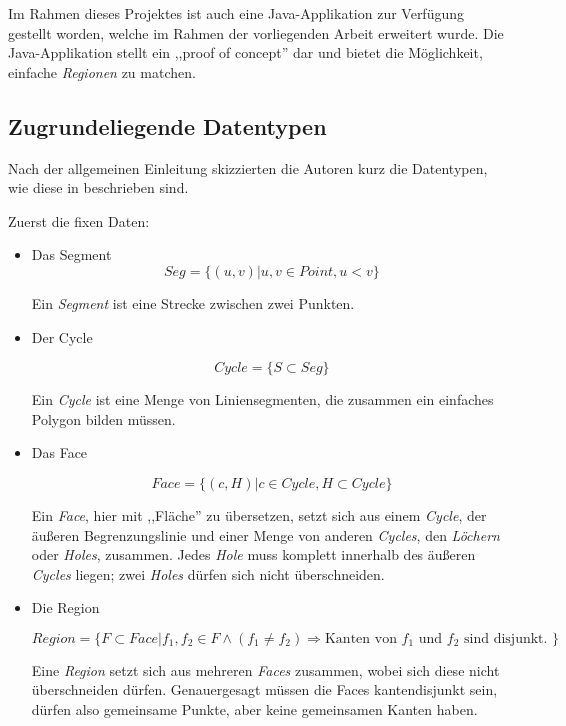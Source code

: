 Im Rahmen dieses Projektes ist auch eine Java-Applikation zur Verfügung gestellt worden, welche im Rahmen der vorliegenden Arbeit erweitert wurde. Die Java-Applikation stellt ein ,,proof of concept'' dar und bietet die Möglichkeit, einfache \textit{Regionen} zu matchen.

\subsection{Zugrundeliegende Datentypen}\label{DatenMoving}
Nach der allgemeinen Einleitung skizzierten die Autoren kurz die Datentypen, wie diese in \cite{FGNS} beschrieben sind.

Zuerst die fixen Daten:

\begin{itemize}

\item Das Segment
$$Seg=\{(u,v)|u,v\in Point, u<v\}$$

Ein \textit{Segment} ist eine Strecke zwischen zwei Punkten. 

\item Der Cycle 

$$Cycle=\{S\subset Seg\}$$

Ein \textit{Cycle} ist eine Menge von Liniensegmenten, die zusammen ein einfaches Polygon bilden müssen.

\item Das Face

$$Face=\{(c,H)|c\in Cycle, H \subset Cycle\}$$

Ein \textit{Face}, hier mit ,,Fläche'' zu übersetzen, setzt sich aus einem \textit{Cycle}, der äußeren Begrenzungslinie und einer Menge von anderen \textit{Cycles}, den \textit{Löchern} oder \textit{Holes}, zusammen. Jedes \textit{Hole} muss komplett innerhalb des äußeren \textit{Cycles} liegen; zwei \textit{Holes} dürfen sich nicht überschneiden. 

\item Die Region

$$Region=\{F\subset Face|f_1,f_2\in F \wedge (f_1\neq f_2) \Rightarrow \text{Kanten von }f_1\text{ und } f_2 \text{ sind disjunkt. } \}$$

Eine \textit{Region} setzt sich aus mehreren \textit{Faces} zusammen, wobei sich diese nicht überschneiden dürfen. Genauergesagt müssen die Faces kantendisjunkt sein, dürfen also gemeinsame Punkte, aber keine gemeinsamen Kanten haben.
\end{itemize}

